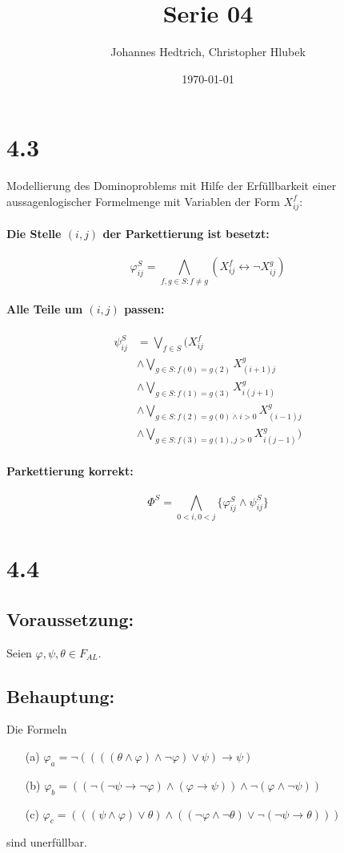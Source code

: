 \documentclass[12pt,a4paper]{scrartcl}
\title{Serie 04}
\author{Johannes Hedtrich, Christopher Hlubek}
\date{\today}
\begin{document}
\section*{4.3}
Modellierung des Dominoproblems mit Hilfe der Erfüllbarkeit einer aussagenlogischer Formelmenge
mit Variablen der Form $X_{ij}^f$:

\paragraph{Die Stelle $(i, j)$ der Parkettierung ist besetzt:}
\[
\varphi_{ij}^S = \bigwedge_{f,g\in S: f \neq g} \left( X_{ij}^f \leftrightarrow \neg X_{ij}^g \right)
\]

\paragraph{Alle Teile um $(i, j)$ passen:}
\begin{align*}
\psi_{ij}^S &= \bigvee_{f\in S} \Big( X_{ij}^f\\
&\wedge \bigvee_{g\in S:f(0) = g(2)} X_{(i+1)j}^g\\
&\wedge \bigvee_{g\in S:f(1) = g(3)} X_{i(j+1)}^g\\
&\wedge \bigvee_{g\in S:f(2) = g(0) \dot \wedge i>0} X_{(i-1)j}^g\\
&\wedge \bigvee_{g\in S:f(3) = g(1), j>0} X_{i(j-1)}^g \Big)
\end{align*}

\paragraph{Parkettierung korrekt:}
\[
\Phi^S = \bigwedge_{0<i,0<j}\lbrace \varphi_{ij}^S \wedge \psi_{ij}^S \rbrace
\]

\section*{4.4}
\subsection*{Voraussetzung:}

Seien $\varphi, \psi, \theta \in F_{AL}$.

\subsection*{Behauptung:}
Die Formeln
\begin{enumerate}
  \item[(a)] $\varphi_a = \neg((((\theta \wedge \varphi) \wedge \neg \varphi) \vee \psi) \rightarrow \psi)$
  \item[(b)] $\varphi_b = ((\neg (\neg \psi \rightarrow \neg \varphi) \wedge (\varphi \rightarrow \psi)) \wedge \neg(\varphi \wedge \neg \psi))$
  \item[(c)] $\varphi_c = (((\psi \wedge \varphi) \vee \theta) \wedge ((\neg \varphi \wedge \neg \theta) \vee \neg(\neg \psi \rightarrow \theta)))$
\end{enumerate}
sind unerfüllbar.
\end{document}
